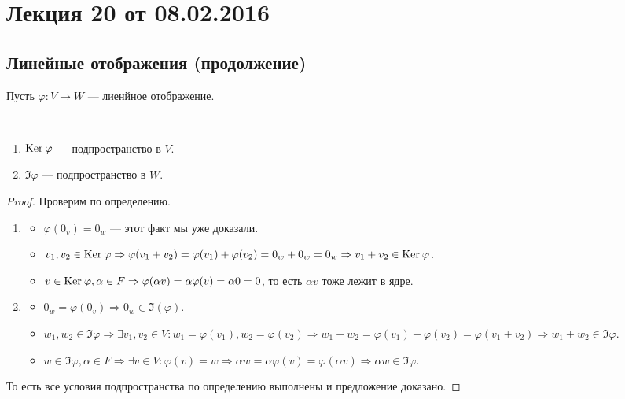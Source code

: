 


\renewcommand{\phi}{\varphi}

\section{Лекция 20 от 08.02.2016}

\subsection{Линейные отображения (продолжение)}
Пусть $\phi\colon V \rightarrow W$ --- лиенйное отображение.

\begin{Suggestion}
	\ 
	\begin{enumerate}
		\item $\Ker \phi$ --- подпространство в $V$.
		\item $\Im \phi$ --- подпространство в $W$.
		
	\end{enumerate}
\end{Suggestion}

\begin{proof}
    Проверим по определению.
    \begin{enumerate}
        \item \begin{itemize}
            \item $\phi(0_v) = 0_w$ --- этот факт мы уже доказали.
            \item $v_1,v_2 \in \Ker \phi \Rightarrow \phi(v_1+v_2) = \phi(v_1) + \phi(v_2) = 0_w + 0_w = 0_w \Rightarrow v_1+v_2 \in \Ker \phi$.
            \item $v \in \Ker \phi, \alpha \in F \Rightarrow \phi(\alpha v) = \alpha \phi(v) = \alpha 0 = 0$, то есть $\alpha v$ тоже лежит в ядре.
        \end{itemize}
        \item \begin{itemize}
            \item $0_w = \phi(0_v) \Rightarrow 0_w \in \Im(\phi)$.
            \item $w_1,w_2 \in \Im \phi \Rightarrow \exists v_1, v_2 \in V\colon w_1 = \phi(v_1), w_2 = \phi(v_2) \Rightarrow w_1 + w_2 = \phi(v_1) + \phi(v_2) = \phi(v_1 + v_2) \Rightarrow w_1 + w_2 \in \Im \phi$.
            \item $w \in \Im \phi, \alpha \in F \Rightarrow \exists v \in V \colon \phi(v) = w \Rightarrow \alpha w = \alpha \phi(v) = \phi(\alpha v) \Rightarrow \alpha w \in \Im \phi$.
            
        \end{itemize}
    \end{enumerate}
    То есть все условия подпространства по определению выполнены и предложение доказано.
\end{proof}

